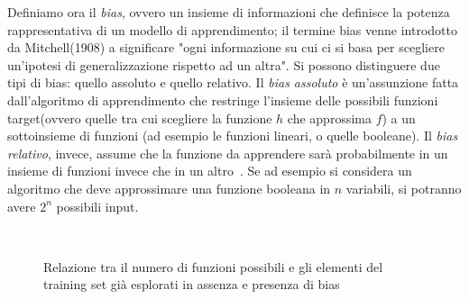 \documentclass[oneside, openany]{book}
\begin{document}
		Definiamo ora il \textit{bias}, ovvero un insieme di informazioni che definisce la potenza rappresentativa di un modello di apprendimento; il termine bias venne introdotto da Mitchell(1908) a significare "ogni informazione su cui ci si basa per scegliere un'ipotesi di generalizzazione rispetto ad un altra". Si possono distinguere due tipi di bias: quello assoluto e quello relativo. Il \textit{bias assoluto} è un'assunzione fatta dall'algoritmo di apprendimento che restringe l'insieme delle possibili funzioni target(ovvero quelle tra cui scegliere la funzione $h$ che approssima $f$) a un sottoinsieme di funzioni (ad esempio le funzioni lineari, o quelle booleane).
		Il \textit{bias relativo}, invece, assume che la funzione da apprendere sarà probabilmente in un insieme di funzioni invece che in un altro~\cite{bib:bias}.
		Se ad esempio si considera un algoritmo che deve approssimare una funzione booleana in $n$ variabili, si potranno avere $2^n$ possibili input. 
		\begin{figure}[h]
			\centering
			 \quad
			 \\
			\caption{Relazione tra il numero di funzioni possibili e gli elementi del training set già esplorati in assenza e presenza di bias}
			\label{fig:bias}
			
		\end{figure}
\end{document}

